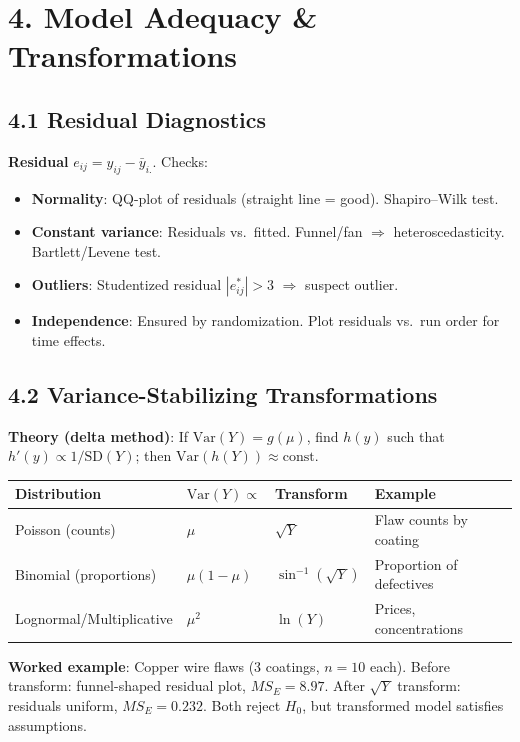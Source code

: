 \documentclass[9pt,letterpaper]{article}
\begin{document}
\section{4. Model Adequacy \& Transformations}

\subsection{4.1 Residual Diagnostics}
\textbf{Residual} $e_{ij}=y_{ij}-\bar{y}_{i.}$. Checks:
\begin{itemize}
    \item \textbf{Normality}: QQ-plot of residuals (straight line = good). Shapiro--Wilk test.
    \item \textbf{Constant variance}: Residuals vs.\ fitted. Funnel/fan $\Rightarrow$ heteroscedasticity. Bartlett/Levene test.
    \item \textbf{Outliers}: Studentized residual $|e^*_{ij}| > 3$ $\Rightarrow$ suspect outlier.
    \item \textbf{Independence}: Ensured by randomization. Plot residuals vs.\ run order for time effects.
\end{itemize}

\subsection{4.2 Variance-Stabilizing Transformations}

\textbf{Theory (delta method)}: If $\text{Var}(Y) = g(\mu)$, find $h(y)$ such that $h'(y) \propto 1/\text{SD}(Y)$; then $\text{Var}(h(Y)) \approx \text{const}$.

\begin{center}\small
\begin{tabular}{@{}llll@{}}
\toprule
Distribution & $\text{Var}(Y) \propto$ & Transform & Example \\
\midrule
Poisson (counts) & $\mu$ & $\sqrt{Y}$ & Flaw counts by coating \\
Binomial (proportions) & $\mu(1-\mu)$ & $\sin^{-1}(\sqrt{Y})$ & Proportion of defectives \\
Lognormal/Multiplicative & $\mu^2$ & $\ln(Y)$ & Prices, concentrations \\
\bottomrule
\end{tabular}
\end{center}

\textbf{Worked example}: Copper wire flaws (3 coatings, $n=10$ each). Before transform: funnel-shaped residual plot, $MS_E = 8.97$. After $\sqrt{Y}$ transform: residuals uniform, $MS_E = 0.232$. Both reject $H_0$, but transformed model satisfies assumptions.
\end{document}

